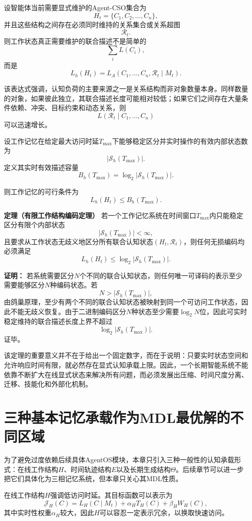 设智能体当前需要显式维护的Agent-CSO集合为
\[
H_t
=
\{C_1,C_2,\ldots,C_n\},
\]
并且这些结构之间存在必须同时维持的关系集合或关系超图
\[
\mathcal{R}_t.
\]
则工作状态真正需要维护的联合描述不是简单的
\[
\sum_i L(C_i),
\]
而是
\[
\boxed{
L_h(H_t)
=
L_A
\left(
C_1,\ldots,C_n,\mathcal{R}_t
\mid
M_t
\right).
}
\]

该表达式强调，认知负荷的主要来源之一是关系结构而非对象数量本身。同样数量的对象，如果彼此独立，其联合描述长度可能相对较低；如果它们之间存在大量条件依赖、冲突、目标约束和动态关系，则
\[
L(\mathcal{R}_t\mid C_1,\ldots,C_n)
\]
可以迅速增长。

设工作记忆在给定最大访问时延$T_{\max}$下能够稳定区分并实时操作的有效内部状态数为
\[
|\mathcal{S}_h(T_{\max})|.
\]
定义其实时有效描述容量
\[
\boxed{
B_h(T_{\max})
=
\log_2
|\mathcal{S}_h(T_{\max})|.
}
\]

则工作记忆的可行条件为
\[
\boxed{
L_h(H_t)
\leq
B_h(T_{\max}).
}
\]

\textbf{定理（有限工作结构编码定理）}
若一个工作记忆系统在时间窗口$T_{\max}$内只能稳定区分有限个内部状态
\[
|\mathcal{S}_h(T_{\max})|<\infty,
\]
且要求从工作状态无歧义地区分所有联合认知状态$(H_t,\mathcal{R}_t)$，则任何无损编码均必须满足
\[
L_h(H_t)
\leq
\log_2|\mathcal{S}_h(T_{\max})|.
\]

\textbf{证明：}
若系统需要区分$N$个不同的联合认知状态，则任何唯一可译码的表示至少需要能够区分$N$种编码状态。若
\[
N>|\mathcal{S}_h(T_{\max})|,
\]
由鸽巢原理，至少有两个不同的联合认知状态被映射到同一个可访问工作状态，因此不能无歧义恢复。由于二进制编码区分$N$种状态至少需要$\log_2N$位，因此可实时稳定维持的联合描述长度上界不超过
\[
\log_2|\mathcal{S}_h(T_{\max})|.
\]
证毕。

该定理的重要意义并不在于给出一个固定数字，而在于说明：只要实时状态空间和允许响应时间有限，就必然存在显式认知承载上限。因此，一个长期智能系统不能依靠不断扩大在线显式状态来解决所有问题，而必须发展出压缩、时间尺度分离、迁移、技能化和外部化机制。

\section{三种基本记忆承载作为MDL最优解的不同区域}

为了避免过度依赖后续具体AgentOS模块，本章只引入三种一般性的认知承载形式：在线工作结构$H$、时间轨迹结构$E$以及长期生成结构$\Theta$。后续章节可以进一步把它们具体化为三相记忆系统，但本章只关心其MDL性质。

在线工作结构$H$强调低访问时延。其目标函数可以表示为
\[
\boxed{
\mathcal{J}_{H}(C)
=
L_H(C\mid M_t)
+
\alpha_H T_H(C)
+
\beta_H W_H(C),
}
\]
其中实时性权重$\alpha_H$较大，因此$H$可以容忍一定表示冗余，以换取快速访问。

